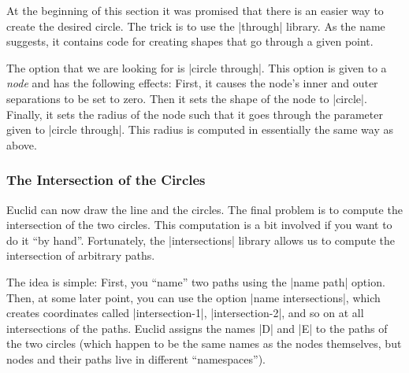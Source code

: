 \begin{paracol}{2}
At the beginning of this section it was promised that there is an easier way to
create the desired circle. The trick is to use the |through| library. As the
name suggests, it contains code for creating shapes that go through a given
point.

The option that we are looking for is |circle through|. This option is given to
a \emph{node} and has the following effects: First, it causes the node's inner
and outer separations to be set to zero. Then it sets the shape of the node to
|circle|. Finally, it sets the radius of the node such that it goes through the
parameter given to |circle through|. This radius is computed in essentially the
same way as above.
%
\begin{codeexample}[preamble={\usetikzlibrary{through}}]
\end{codeexample}


\subsubsection{The Intersection of the Circles}

Euclid can now draw the line and the circles. The final problem is to compute
the intersection of the two circles. This computation is a bit involved if you
want to do it ``by hand''. Fortunately, the |intersections| library allows us
to compute the intersection of arbitrary paths.

The idea is simple: First, you ``name'' two paths using the |name path| option.
Then, at some later point, you can use the option |name intersections|, which
creates coordinates called |intersection-1|, |intersection-2|, and so on at all
intersections of the paths. Euclid assigns the names |D| and |E| to the paths
of the two circles (which happen to be the same names as the nodes themselves,
but nodes and their paths live in different ``namespaces'').
%
\begin{codeexample}[preamble={\usetikzlibrary{intersections,through}}]
\end{codeexample}
\end{paracol}
